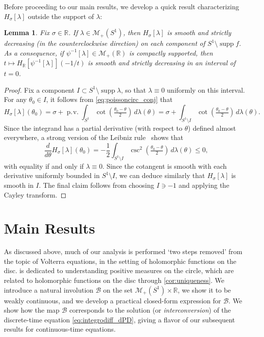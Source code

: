 \documentclass{cams-l} %
\newcommand{\dave}[1]{#1}\newcommand{\davebegin}{}\newcommand{\daveend}{}\newcommand{\george}[1]{#1}
\newcommand{\RR}{\mathbb R}
\newcommand{\cM}{\mathcal M}
\newcommand{\cB}{\mathcal B}
\newcommand{\op}{\operatorname}
\newcommand{\supp}{\operatorname{supp}}
\newcommand{\pv}{\op{p.\!v.}}
\newtheorem{lemma}[theorem]{Lemma}
\theoremstyle{definition}
\theoremstyle{remark}
\numberwithin{equation}{section}
\begin{document}
Before proceeding \dave{to our main results}, we develop a quick result characterizing $H_\sigma[\lambda]$ outside the support of $\lambda$:
\begin{lemma}\label{lem:smooth}
    Fix $\sigma\in\RR$. If $\lambda\in\cM_+(S^1)$, then $H_\sigma[\lambda]$ is smooth and strictly decreasing (in the counterclockwise direction) on each component of $S^1\setminus\supp f$. As a consequence, if $\psi^{-1}[\lambda]\in \cM_+(\RR)$ is compactly supported, then $t\mapsto H_\RR[\psi^{-1}[\lambda]](-1/t)$ is smooth and strictly decreasing in an interval of $t=0$.
\end{lemma}
\begin{proof}
    Fix a component $I\subset S^1\setminus\supp \lambda$, so that $\lambda\equiv 0$ uniformly on this interval. For any $\theta_0\in I$, it follows from \cref{eq:poissoncirc_conj} that
    \[
        H_\sigma[\lambda](\theta_0) = \sigma+\pv\int_{S^1}\cot\left(\tfrac{\theta_0-\theta}{2}\right)\,d\lambda(\theta) = \sigma+\int_{S^1\setminus I}\cot\left(\tfrac{\theta_0-\theta}{2}\right)\,d\lambda(\theta).
    \]
    Since the integrand has a partial derivative (with respect to $\theta$) defined almost everywhere, a strong version of the Leibniz rule~\cite{folland2013real} shows that
    \[
    \frac{d}{d\theta}H_\sigma[\lambda](\theta_0) = -\frac{1}{2}\int_{S^1\setminus I} \csc^2\left(\tfrac{\theta_0-\theta}{2}\right)\,d\lambda(\theta)\leq 0,
\]
    with equality if and only if $\lambda\equiv 0$. Since the cotangent is smooth with each derivative uniformly bounded in $S^1\setminus I$, we can deduce similarly that $H_\sigma[\lambda]$ is smooth in $I$. The final claim follows from choosing $I\ni -1$ and applying the Cayley transform.
\end{proof}
\section{Main Results}\label{sec:main}
As discussed above, much of our analysis is performed `two steps removed' from the topic of Volterra equations, in the setting of holomorphic functions on the disc.  is dedicated to understanding positive measures on the circle, which are related to holomorphic functions on the disc through \cref{cor:uniqueness}. We introduce a natural involution $\cB$ on the set $\cM_+(S^1)\times\RR$, we show it to be weakly continuous, and we develop a practical closed-form expression for $\cB$. We show how the map $\cB$ corresponds to the solution (or \emph{interconversion}) of the discrete-time equation \ref{eq:integrodiff_dPD}, giving a flavor of our subsequent results for continuous-time equations.
\end{document}
